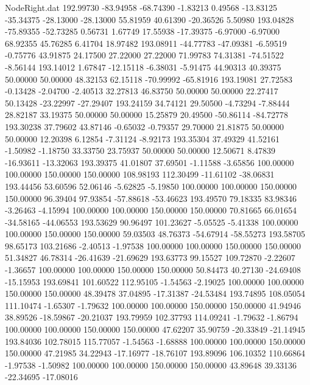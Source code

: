 \begin{filecontents}{NodeRight.dat}
 192.99730  -83.94958  -68.74390    -1.83213    0.49568  -13.83125  -35.34375  -28.13000  -28.13000   55.81959   40.61390  -20.36526    5.50980
 193.04828  -75.89355  -52.73285     0.56731    1.67749   17.55938  -17.39375   -6.97000   -6.97000   68.92355   45.76285    6.41704   18.97482
 193.08911  -44.77783  -47.09381    -6.59519   -0.75776   43.91875   24.17500   27.22000   27.22000   71.99783   74.31381  -74.51522   -8.56144
 193.14012    1.67847  -12.15118    -6.38031   -5.91475   44.90313   40.39375   50.00000   50.00000   48.32153   62.15118  -70.99992  -65.81916
 193.19081   27.72583   -0.13428    -2.04700   -2.40513   32.27813   46.83750   50.00000   50.00000   22.27417   50.13428  -23.22997  -27.29407
 193.24159   34.74121   29.50500    -4.73294   -7.88444   28.82187   33.19375   50.00000   50.00000   15.25879   20.49500  -50.86114  -84.72778
 193.30238   37.79602   43.87146    -0.65032   -0.79357   29.70000   21.81875   50.00000   50.00000   12.20398    6.12854   -7.31124   -8.92173
 193.35304   37.49329   41.52161    -1.50982   -1.18750   33.33750   23.75937   50.00000   50.00000   12.50671    8.47839  -16.93611  -13.32063
 193.39375   41.01807   37.69501    -1.11588   -3.65856  100.00000  100.00000  150.00000  150.00000  108.98193  112.30499  -11.61102  -38.06831
 193.44456   53.60596   52.06146    -5.62825   -5.19850  100.00000  100.00000  150.00000  150.00000   96.39404   97.93854  -57.88618  -53.46623
 193.49570   79.18335   83.98346    -3.26463   -4.15994  100.00000  100.00000  150.00000  150.00000   70.81665   66.01654  -34.58165  -44.06553
 193.53629   90.96497  101.23627    -5.05525   -5.41338  100.00000  100.00000  150.00000  150.00000   59.03503   48.76373  -54.67914  -58.55273
 193.58705   98.65173  103.21686    -2.40513   -1.97538  100.00000  100.00000  150.00000  150.00000   51.34827   46.78314  -26.41639  -21.69629
 193.63773   99.15527  109.72870    -2.22607   -1.36657  100.00000  100.00000  150.00000  150.00000   50.84473   40.27130  -24.69408  -15.15953
 193.69841  101.60522  112.95105    -1.54563   -2.19025  100.00000  100.00000  150.00000  150.00000   48.39478   37.04895  -17.31387  -24.53484
 193.74895  108.05054  111.10474    -1.65307   -1.79632  100.00000  100.00000  150.00000  150.00000   41.94946   38.89526  -18.59867  -20.21037
 193.79959  102.37793  114.09241    -1.79632   -1.86794  100.00000  100.00000  150.00000  150.00000   47.62207   35.90759  -20.33849  -21.14945
 193.84036  102.78015  115.77057    -1.54563   -1.68888  100.00000  100.00000  150.00000  150.00000   47.21985   34.22943  -17.16977  -18.76107
 193.89096  106.10352  110.66864    -1.97538   -1.50982  100.00000  100.00000  150.00000  150.00000   43.89648   39.33136  -22.34695  -17.08016

\end{filecontents}

